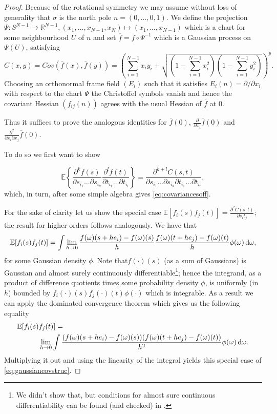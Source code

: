 \begin{proof}
	Because of the rotational symmetry we may assume without loss of generality that $\sigma$ is the north pole $n=(0,\dots,0,1)$. We define the projection $\Psi:S^{N-1}\rightarrow\mathbb R^{N-1}, (x_1,\dots,x_{N-1},x_N)\mapsto(x_1,\dots,x_{N-1})$ which is a chart for some neighbourhood $U$ of $n$ and set $\overline f = f\circ\Psi^{-1}$ which is a Gaussian process on $\Psi(U)$, satisfying $$C(x,y)=Cov(\overline f(x),\overline f(y))=\left(\sum_{i=1}^{N-1}x_iy_i + \sqrt{(1-\textstyle\sum_{i=1}^{N-1}x_i^2)(1-\textstyle\sum_{i=1}^{N-1}y_i^2)}\right)^p.$$
	Choosing an orthonormal frame field $(E_i)$ such that it satisfies $E_i(n)=\partial/\partial x_i$ with respect to the chart $\Psi$ the Christoffel symbols vanish and hence the covariant Hessian $(f_{ij}(n))$ agrees with the usual Hessian of $\overline f$ at $0$.
	
	Thus it suffices to prove the analogous identities for $\overline f(0)$, $\frac{\partial}{\partial x_i}\overline f(0)$ and $\frac{\partial^2}{\partial x_i\partial x_j}\overline f(0)$.
	
	To do so we first want to show 
	
	\begin{equation}\label{eq:gaussiancovstruc}
	\mathbb E\left\{\frac{\partial^k \overline f(s)}{\partial s_{i_1}\dots\partial s_{i_k}} \frac{\partial^l \overline f(t)}{\partial t_{i_1}\dots\partial t_{i_l}}\right\}=\frac{\partial^{k+l} C(s,t)}{\partial s_{i_1}\dots\partial s_{i_k}\partial t_{i_1}\dots\partial t_{i_l}},
	\end{equation}
	which, in turn, after some simple algebra gives \eqref{eq:covariancesoff}.
		
	For the sake of clarity let us show the special case $\mathbb E[f_i(s)f_j(t)]=\frac{\partial^2 C(s,t)}{\partial s_it_j}$; the result for higher orders follows analogously. We have that $$\mathbb E[f_i(s)f_j(t)] = \int \lim_{h\rightarrow 0} \frac{f(\omega)(s+he_i)-f(\omega)(s)}{h}\frac{f(\omega)(t+he_j)-f(\omega)(t)}{h}\phi(\omega)\mathop{}\!\mathrm{d}\omega,$$ for some Gaussian density $\phi$. Note that$f(\cdot)(s)$ (as a sum of Gaussians) is Gaussian and almost surely continuously differentiable\footnote{We didn't show that, but conditions for almost sure continuous differentiability can be found (and checked) in \cite{Adler07}.}; hence the integrand, as a product of difference quotients times some probability density $\phi$, is uniformly (in $h$) bounded by $f_i(\cdot)(s)f_j(\cdot)(t)\phi(\cdot)$ which is integrable. As a result we can apply the dominated convergence theorem which gives us the following equality 
	\begin{align*}
		\mathbb E[f_i(s)&f_j(t)]=\\
		&\lim_{h\rightarrow 0}\int\frac{(f(\omega)(s+he_i)-f(\omega)(s))(f(\omega)(t+he_j)-f(\omega)(t))}{h^2}\phi(\omega)\mathop{}\!\mathrm{d}\omega.
	\end{align*}
	Multiplying it out and using the linearity of the integral yields this special case of \eqref{eq:gaussiancovstruc}.
	
\end{proof}

